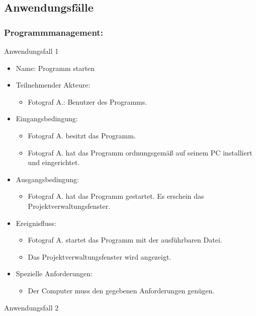 \subsection{Anwendungsfälle}

	\subsubsection{Programmmanagement:}
	\begin{description}
	\item[Anwendungsfall 1]
	\end{description}
	\begin{itemize}
		\item Name: Programm starten
		\item Teilnehmender Akteure:
		\begin{itemize}
			\item	Fotograf A.: Benutzer des Programms.
		\end{itemize}
		\item Eingangsbedingung:
		\begin{itemize}
			\item Fotograf A. besitzt das Programm.
			\item Fotograf A. hat das Programm ordnungsgemäß auf seinem PC installiert und eingerichtet.						
		\end{itemize}
		\item Ausgangsbedingung:
		\begin{itemize}
			\item	Fotograf A. hat das Programm gestartet. Es erschein das Projektverwaltungsfenster.		
		\end{itemize}
		\item Ereignisfluss:	
		\begin{itemize}
			\item Fotograf A. startet das Programm mit der ausführbaren Datei.		
			\item Das Projektverwaltungsfenster wird angezeigt.
		\end{itemize}
		\item Spezielle Anforderungen:
		\begin{itemize}
			\item	Der Computer muss den gegebenen Anforderungen genügen.
		\end{itemize}
	\end{itemize}
	\begin{description}
	\item[Anwendungsfall 2]
	\end{description}
	
